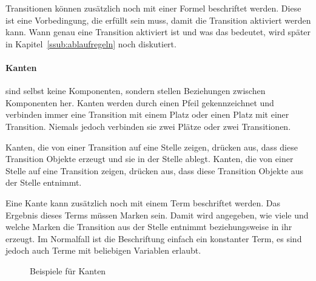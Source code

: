 	Transitionen können zusätzlich noch mit einer Formel beschriftet werden. Diese ist eine Vorbedingung, die erfüllt sein muss, damit die Transition aktiviert werden kann. Wann genau eine Transition aktiviert ist und was das bedeutet, wird später in Kapitel~\ref{ssub:ablaufregeln} noch diskutiert.

	\paragraph{Kanten} sind selbst keine Komponenten, sondern stellen Beziehungen zwischen Komponenten her. Kanten werden durch einen Pfeil gekennzeichnet und verbinden immer eine Transition mit einem Platz oder einen Platz mit einer Transition. Niemals jedoch verbinden sie zwei Plätze oder zwei Transitionen.

	Kanten, die von einer Transition auf eine Stelle zeigen, drücken aus, dass diese Transition Objekte erzeugt und sie in der Stelle ablegt. Kanten, die von einer Stelle auf eine Transition zeigen, drücken aus, dass diese Transition Objekte aus der Stelle entnimmt.

	Eine Kante kann zusätzlich noch mit einem Term beschriftet werden. Das Ergebnis dieses Terms müssen Marken sein. Damit wird angegeben, wie viele und welche Marken die Transition aus der Stelle entnimmt beziehungsweise in ihr erzeugt. Im Normalfall ist die Beschriftung einfach ein konstanter Term, es sind jedoch auch Terme mit beliebigen Variablen erlaubt.

	\begin{figure}[ht]
		\centering
		\caption{Beispiele für Kanten}
		\label{fig:kanten}
	\end{figure}

